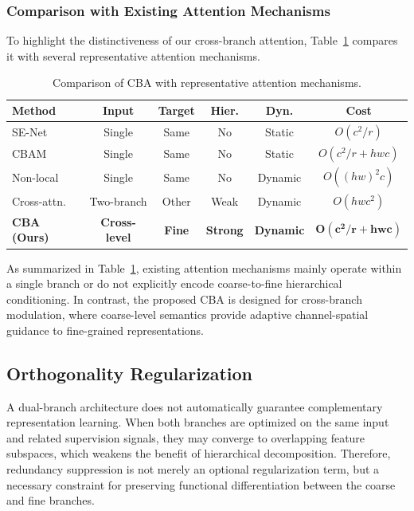 \documentclass[pdflatex,sn-mathphys-num]{sn-jnl}
\theoremstyle{thmstyleone}%
\theoremstyle{thmstyletwo}%
\theoremstyle{thmstylethree}%
\begin{document}
\subsubsection{Comparison with Existing Attention Mechanisms}
To highlight the distinctiveness of our cross-branch attention, Table~\ref{tab:attention_comparison} compares it with several representative attention mechanisms.
\begin{table}[htbp]
    \centering
    \caption{Comparison of CBA with representative attention mechanisms.}
    \label{tab:attention_comparison}
    \setlength{\tabcolsep}{4pt}
    \renewcommand{\arraystretch}{1.1}
    \small
    \begin{tabular}{@{}lccccc@{}}
    \toprule
    \textbf{Method} & \textbf{Input} & \textbf{Target} & \textbf{Hier.} & \textbf{Dyn.} & \textbf{Cost} \\
    \midrule
    SE-Net      & Single     & Same  & No   & Static  & $O(c^2/r)$ \\
    CBAM        & Single     & Same  & No   & Static  & $O(c^2/r + hwc)$ \\
    Non-local   & Single     & Same  & No   & Dynamic & $O((hw)^2c)$ \\
    Cross-attn. & Two-branch & Other & Weak & Dynamic & $O(hwc^2)$ \\
    \midrule
    \textbf{CBA (Ours)} & \textbf{Cross-level} & \textbf{Fine} & \textbf{Strong} & \textbf{Dynamic} & $\mathbf{O(c^2/r + hwc)}$ \\
    \bottomrule
    \end{tabular}
\end{table}
As summarized in Table~\ref{tab:attention_comparison}, existing attention mechanisms mainly operate within a single branch or do not explicitly encode coarse-to-fine hierarchical conditioning. In contrast, the proposed CBA is designed for cross-branch modulation, where coarse-level semantics provide adaptive channel-spatial guidance to fine-grained representations.

\subsection{Orthogonality Regularization}
\label{sec:orth}
A dual-branch architecture does not automatically guarantee complementary representation learning. 
When both branches are optimized on the same input and related supervision signals, they may converge to overlapping feature subspaces, which weakens the benefit of hierarchical decomposition. 
Therefore, redundancy suppression is not merely an optional regularization term, but a necessary constraint for preserving functional differentiation between the coarse and fine branches.
\end{document}
